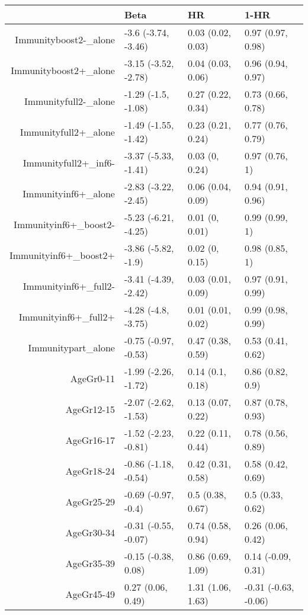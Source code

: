 \begin{table}[ht]
\centering
\begin{tabular}{rlll}
  \hline
 & Beta & HR & 1-HR \\ 
  \hline
Immunityboost2-\_alone & -3.6 (-3.74, -3.46) & 0.03 (0.02, 0.03) & 0.97 (0.97, 0.98) \\ 
  Immunityboost2+\_alone & -3.15 (-3.52, -2.78) & 0.04 (0.03, 0.06) & 0.96 (0.94, 0.97) \\ 
  Immunityfull2-\_alone & -1.29 (-1.5, -1.08) & 0.27 (0.22, 0.34) & 0.73 (0.66, 0.78) \\ 
  Immunityfull2+\_alone & -1.49 (-1.55, -1.42) & 0.23 (0.21, 0.24) & 0.77 (0.76, 0.79) \\ 
  Immunityfull2+\_inf6- & -3.37 (-5.33, -1.41) & 0.03 (0, 0.24) & 0.97 (0.76, 1) \\ 
  Immunityinf6+\_alone & -2.83 (-3.22, -2.45) & 0.06 (0.04, 0.09) & 0.94 (0.91, 0.96) \\ 
  Immunityinf6+\_boost2- & -5.23 (-6.21, -4.25) & 0.01 (0, 0.01) & 0.99 (0.99, 1) \\ 
  Immunityinf6+\_boost2+ & -3.86 (-5.82, -1.9) & 0.02 (0, 0.15) & 0.98 (0.85, 1) \\ 
  Immunityinf6+\_full2- & -3.41 (-4.39, -2.42) & 0.03 (0.01, 0.09) & 0.97 (0.91, 0.99) \\ 
  Immunityinf6+\_full2+ & -4.28 (-4.8, -3.75) & 0.01 (0.01, 0.02) & 0.99 (0.98, 0.99) \\ 
  Immunitypart\_alone & -0.75 (-0.97, -0.53) & 0.47 (0.38, 0.59) & 0.53 (0.41, 0.62) \\ 
  AgeGr0-11 & -1.99 (-2.26, -1.72) & 0.14 (0.1, 0.18) & 0.86 (0.82, 0.9) \\ 
  AgeGr12-15 & -2.07 (-2.62, -1.53) & 0.13 (0.07, 0.22) & 0.87 (0.78, 0.93) \\ 
  AgeGr16-17 & -1.52 (-2.23, -0.81) & 0.22 (0.11, 0.44) & 0.78 (0.56, 0.89) \\ 
  AgeGr18-24 & -0.86 (-1.18, -0.54) & 0.42 (0.31, 0.58) & 0.58 (0.42, 0.69) \\ 
  AgeGr25-29 & -0.69 (-0.97, -0.4) & 0.5 (0.38, 0.67) & 0.5 (0.33, 0.62) \\ 
  AgeGr30-34 & -0.31 (-0.55, -0.07) & 0.74 (0.58, 0.94) & 0.26 (0.06, 0.42) \\ 
  AgeGr35-39 & -0.15 (-0.38, 0.08) & 0.86 (0.69, 1.09) & 0.14 (-0.09, 0.31) \\ 
  AgeGr45-49 & 0.27 (0.06, 0.49) & 1.31 (1.06, 1.63) & -0.31 (-0.63, -0.06) \\ 

\end{tabular}
\end{table}
